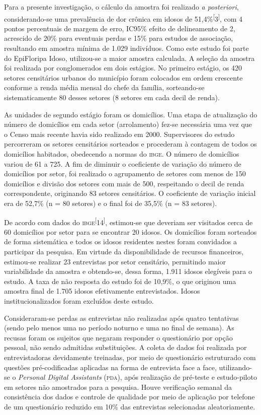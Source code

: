 \documentclass{article}
\begin{document}
Para a presente investigação, o cálculo da amostra foi realizado \textit{a
posteriori}, considerando-se uma prevalência de dor crônica em idosos de
51,4\%\textsuperscript{[}3\textsuperscript{]}, com 4 pontos percentuais de margem de erro, IC95\% efeito de delineamento de
2, acrescido de 20\% para eventuais perdas e 15\% para estudos de associação,
resultando em amostra mínima de 1.029 indivíduos. Como este estudo foi parte do
EpiFloripa Idoso, utilizou-se a maior amostra calculada. A seleção da amostra
foi realizada por conglomerados em dois estágios. No primeiro estágio, os 420
setores censitários urbanos do município foram colocados em ordem crescente
conforme a renda média mensal do chefe da família, sorteando-se sistematicamente
80 desses setores (8 setores em cada decil de renda).

As unidades de segundo estágio foram os domicílios. Uma etapa de atualização do
número de domicílios em cada setor (arrolamento) fez-se necessária uma vez que o
Censo mais recente havia sido realizado em 2000. Supervisores do estudo
percorreram os setores censitários sorteados e procederam à contagem de todos os
domicílios habitados, obedecendo a normas do \textsc{ibge}. O número de domicílios variou
de 61 a 725. A fim de diminuir o coeficiente de variação do número de domicílios
por setor, foi realizado o agrupamento de setores com menos de 150 domicílios e
divisão dos setores com mais de 500, respeitando o decil de renda
correspondente, originando 83 setores censitários. O coeficiente de variação
inicial era de 52,7\% (n = 80 setores) e o final foi de 35,5\% (n = 83 setores).

De acordo com dados do \textsc{ibge}\textsuperscript{[}14\textsuperscript{]}, estimou-se que deveriam ser visitados cerca de 60 domicílios por setor para se
encontrar 20 idosos. Os domicílios foram sorteados de forma sistemática e todos
os idosos residentes nestes foram convidados a participar da pesquisa. Em
virtude da disponibilidade de recursos financeiros, estimou-se realizar 23
entrevistas por setor censitário, permitindo maior variabilidade da amostra e
obtendo-se, dessa forma, 1.911 idosos elegíveis para o estudo. A taxa de não
resposta do estudo foi de 10,9\%, o que originou uma amostra final de 1.705
idosos efetivamente entrevistados. Idosos institucionalizados foram excluídos
deste estudo.

Consideraram-se perdas as entrevistas não realizadas após quatro tentativas
(sendo pelo menos uma no período noturno e uma no final de semana). As recusas
foram os sujeitos que negaram responder o questionário por opção pessoal, não
sendo admitidas substituições. A coleta de dados foi realizada por
entrevistadoras devidamente treinadas, por meio de questionário estruturado com
questões pré-codificadas aplicadas na forma de entrevista face a face,
utilizando-se o \textit{Personal Digital Assistants}
(\textsc{pda}), após realização de pré-teste e estudo-piloto em setores não amostrados
para a pesquisa. Houve verificação semanal da consistência dos dados e controle
de qualidade por meio de aplicação por telefone de um questionário reduzido em
10\% das entrevistas selecionadas aleatoriamente.
\end{document}
